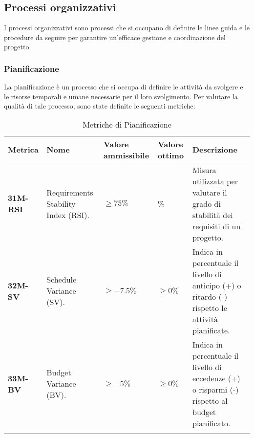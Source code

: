 \subsection{Processi organizzativi}
I processi organizzativi sono processi che si occupano di definire le linee guida e le procedure da seguire per garantire un'efficace gestione e coordinazione del progetto.

\subsubsection{Pianificazione}
La pianificazione è un processo che si occupa di definire le attività da svolgere e le risorse temporali e umane necessarie
per il loro svolgimento. Per valutare la qualità di tale processo, sono state definite le seguenti metriche:
\begin{longtable}{|>{\raggedright\arraybackslash}m{}|>{\raggedright\arraybackslash}m{}|>{\raggedright\arraybackslash}m{}|>{\raggedright\arraybackslash}m{}|>{\raggedright\arraybackslash}m{}|}
	\hline
	\textbf{Metrica} & \textbf{Nome} & \textbf{Valore ammissibile} & \textbf{Valore ottimo} & \textbf{Descrizione}\\
	\hline
	\endfirsthead
	\hline
	\textbf{31M-RSI} & Requirements Stability Index (RSI). & $\geq 75\% $ & 100\% & Misura utilizzata per valutare il grado di stabilità dei requisiti di un progetto.\\
	\hline
	\textbf{32M-SV} & Schedule Variance (SV). & $\geq -7.5\%$ & $\geq 0\%$ & Indica in percentuale il livello di anticipo (+) o ritardo (-) rispetto le attività pianificate.\\
	\hline
	\textbf{33M-BV} & Budget Variance (BV). & $\geq -5\%$ & $\geq 0\%$ & Indica in percentuale il livello di eccedenze (+) o risparmi (-) rispetto al budget pianificato.\\
	\hline
	\caption{Metriche di Pianificazione}
	\label{table:11}
\end{longtable}
